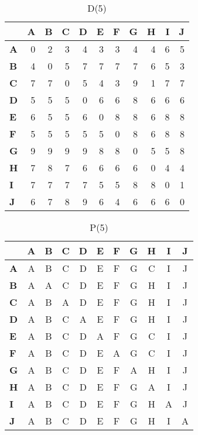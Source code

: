 \documentclass{article}
\begin{document}
\begin{table}[H]\centering
\caption{D(5)}
\begin{tabular}{l r r r r r r r r r r}
\toprule
 & \textbf{A} & \textbf{B} & \textbf{C} & \textbf{D} & \textbf{E} & \textbf{F} & \textbf{G} & \textbf{H} & \textbf{I} & \textbf{J}\\\midrule
\textbf{A} & 0 & 2 & 3 & 4 & 3 & 3 & 4 & 4 & 6 & 5 \\
\textbf{B} & 4 & 0 & 5 & 7 & 7 & 7 & 7 & 6 & 5 & 3 \\
\textbf{C} & 7 & 7 & 0 & 5 & 4 & 3 & 9 & 1 & 7 & 7 \\
\textbf{D} & 5 & 5 & 5 & 0 & 6 & 6 & 8 & 6 & 6 & 6 \\
\textbf{E} & 6 & 5 & 5 & 6 & 0 & 8 & 8 & 6 & 8 & 8 \\
\textbf{F} & 5 & 5 & 5 & 5 & 5 & 0 & 8 & 6 & 8 & 8 \\
\textbf{G} & 9 & 9 & 9 & 9 & 8 & 8 & 0 & 5 & 5 & 8 \\
\textbf{H} & 7 & 8 & 7 & 6 & 6 & 6 & 6 & 0 & 4 & 4 \\
\textbf{I} & 7 & 7 & 7 & 7 & 5 & 5 & 8 & 8 & 0 & 1 \\
\textbf{J} & 6 & 7 & 8 & 9 & 6 & 4 & 6 & 6 & 6 & 0 \\
\bottomrule
\end{tabular}
\end{table}

\begin{table}[H]\centering
\caption{P(5)}
\begin{tabular}{l c c c c c c c c c c}
\toprule
 & \textbf{A} & \textbf{B} & \textbf{C} & \textbf{D} & \textbf{E} & \textbf{F} & \textbf{G} & \textbf{H} & \textbf{I} & \textbf{J}\\\midrule
\textbf{A} & A & B & C & D & E & F & G & C & I & J \\
\textbf{B} & A & A & C & D & E & F & G & H & I & J \\
\textbf{C} & A & B & A & D & E & F & G & H & I & J \\
\textbf{D} & A & B & C & A & E & F & G & H & I & J \\
\textbf{E} & A & B & C & D & A & F & G & C & I & J \\
\textbf{F} & A & B & C & D & E & A & G & C & I & J \\
\textbf{G} & A & B & C & D & E & F & A & H & I & J \\
\textbf{H} & A & B & C & D & E & F & G & A & I & J \\
\textbf{I} & A & B & C & D & E & F & G & H & A & J \\
\textbf{J} & A & B & C & D & E & F & G & H & I & A \\
\bottomrule
\end{tabular}
\end{table}
\end{document}
